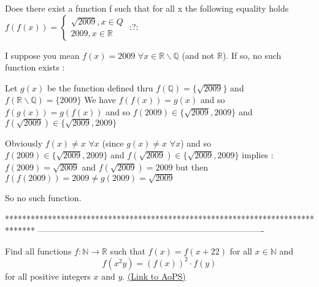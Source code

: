 \begin{solution}
	\begin{tcolorbox}Does there exist a function f such that for all x the following equality holds  $ f(f(x)) = \left\{\begin{array}{l} \sqrt {2009} ,x\in Q \\
2009,x\in\mathbb{R} \end{array}\right.$  :?:\end{tcolorbox}

I suppose you mean $ f(x)=2009$ $ \forall x\in\mathbb R\backslash \mathbb Q$ (and not $ \mathbb R$). If so, no such function exists :

Let $ g(x)$ be the function defined thru $ f(\mathbb Q)=\{\sqrt{2009}\}$ and $ f(\mathbb R\backslash \mathbb Q)=\{2009\}$ 
We have $ f(f(x))=g(x)$ and so $ f(g(x))=g(f(x))$ and so $ f(2009)\in\{\sqrt{2009},2009\}$ and $ f(\sqrt{2009})\in\{\sqrt{2009},2009\}$

Obviously $ f(x)\neq x$ $ \forall x$ (since $ g(x)\neq x$ $ \forall x$) and so $ f(2009)\in\{\sqrt{2009},2009\}$ and $ f(\sqrt{2009})\in\{\sqrt{2009},2009\}$ implies :
$ f(2009)=\sqrt{2009}$ and $ f(\sqrt{2009})=2009$ but then $ f(f(2009))=2009\ne g(2009)=\sqrt{2009}$

So no such function.
\end{solution}
*******************************************************************************
-------------------------------------------------------------------------------

\begin{problem}
	Find all functions $ f: \mathbb N \to \mathbb R$ such that $ f(x)=f(x+22)$ for all $x \in \mathbb N$ and
\[f(x^2y)=(f(x))^2 \cdot f(y)\]
for all positive integers $x$ and $y$.
	\flushright \href{https://artofproblemsolving.com/community/c6h309049}{(Link to AoPS)}
\end{problem}




